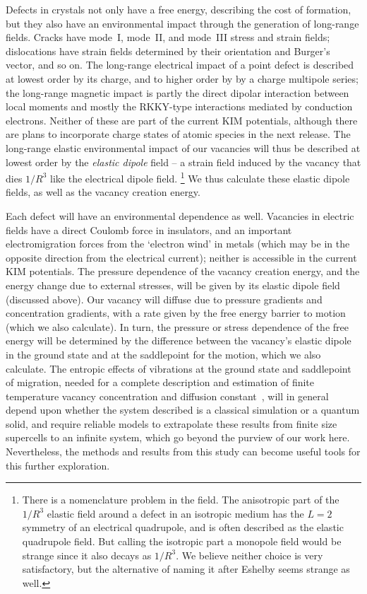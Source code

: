 \documentclass[%
 reprint,
 nofootinbib,
 amsmath,amssymb,
 aps,
]{revtex4-1}
\begin{document}
Defects in crystals not only have a free energy, describing the cost of formation, but they also have an environmental impact through the generation of long-range fields.
Cracks have mode~I, mode~II, and mode~III stress and strain fields; dislocations have strain fields determined by their orientation and Burger's vector, and so on.
The long-range electrical impact of a point defect is described at lowest order by its charge, and to higher order by by a charge multipole series;
the long-range magnetic impact is partly the direct dipolar interaction between local moments and mostly the RKKY-type interactions mediated by conduction electrons.
Neither of these are part of the current KIM potentials, although there are plans to incorporate charge states of atomic species in the next release.
The long-range elastic environmental impact of our vacancies will thus be described at lowest order by the {\em elastic dipole} field -- a strain field induced by the vacancy that dies $1/R^3$ like the electrical dipole field.%
\footnote{
There is a nomenclature problem in the field.
The anisotropic part of the $1/R^3$ elastic field around a defect in an isotropic medium has the $L=2$ symmetry of an electrical quadrupole, and is often described as the elastic quadrupole field.
But calling the isotropic part a monopole field would be strange since it also decays as $1/R^3$.
We believe neither choice is very satisfactory, but the alternative of naming it after Eshelby seems strange as well.
}
We thus calculate these elastic dipole fields, as well as the vacancy creation energy.

Each defect will have an environmental dependence as well.
Vacancies in electric fields have a direct Coulomb force in insulators, and an important electromigration forces from the `electron wind' in metals (which may be in the opposite direction from the electrical current); neither is accessible in the current KIM potentials.
The pressure dependence of the vacancy creation energy, and the energy change due to external stresses, will be given by its elastic dipole field (discussed above).
Our vacancy will diffuse due to pressure gradients and concentration gradients, with a rate given by the free energy barrier to motion (which we also calculate).
In turn, the pressure or stress dependence of the free energy will be determined by the difference between the vacancy's elastic dipole in the ground state and at the saddlepoint for the motion, which we also calculate.
The entropic effects of vibrations at the ground state and saddlepoint of migration, needed for a complete description and estimation of finite temperature vacancy concentration and diffusion constant~\cite{burada2009diffusion}, will in general depend upon whether the system described is a classical simulation or a quantum solid, and require reliable models to extrapolate these results from finite size supercells to an infinite system, which go beyond the purview of our work here.
Nevertheless, the methods and results from this study can become useful tools for this further exploration.
\end{document}
